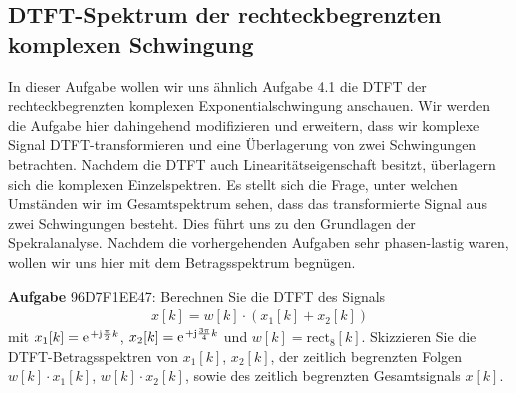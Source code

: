 \subsection{DTFT-Spektrum der rechteckbegrenzten komplexen Schwingung}
\label{sec:96D7F1EE47}
\begin{Ziel}
In dieser Aufgabe wollen wir uns ähnlich Aufgabe 4.1
die DTFT der rechteckbegrenzten komplexen Exponentialschwingung anschauen.
Wir werden die Aufgabe hier dahingehend modifizieren und erweitern, dass
wir komplexe Signal DTFT-transformieren und eine Überlagerung von zwei Schwingungen
betrachten. Nachdem die DTFT auch Linearitätseigenschaft besitzt, überlagern
sich die komplexen Einzelspektren. Es stellt sich die Frage, unter welchen
Umständen wir im Gesamtspektrum sehen, dass das transformierte Signal aus
zwei Schwingungen besteht. Dies führt uns zu den Grundlagen der Spekralanalyse.
Nachdem die vorhergehenden Aufgaben sehr phasen-lastig waren, wollen wir
uns hier mit dem Betragsspektrum begnügen.
\end{Ziel}
\textbf{Aufgabe} {\tiny 96D7F1EE47}:
Berechnen Sie die DTFT des Signals
\begin{align}
x[k] = w[k] \cdot
\left(
x_1[k] + x_2[k]
\right)
\end{align}
mit $x_1[k] = \e^{+\im\frac{\pi}{2} k}$, $x_2[k] = \e^{+\im\frac{3\pi}{4} k}$
und $w[k] = \mathrm{rect}_8[k]$.
%
Skizzieren Sie die DTFT-Betragsspektren von $x_1[k]$, $x_2[k]$,
der zeitlich begrenzten Folgen $w[k] \cdot x_1[k]$, $w[k] \cdot x_2[k]$, sowie
des zeitlich begrenzten Gesamtsignals $x[k]$.


